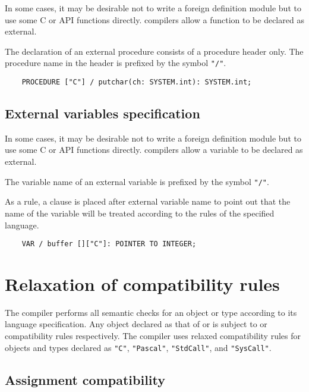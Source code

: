 In some cases, it may be desirable not to write a foreign
definition module but to use some C or API functions directly.
\xds{} compilers allow a function to be declared as external.

The declaration of an external procedure consists of a procedure
header only. The procedure name in the header is prefixed by the
symbol \verb|"/"|.

\verb'    PROCEDURE ["C"] / putchar(ch: SYSTEM.int): SYSTEM.int;'


\subsection{External variables specification}
\label{multilang:extvar}

In some cases, it may be desirable not to write a foreign
definition module but to use some C or API functions directly.
\xds{} compilers allow a variable to be declared as external.

The variable name of an external variable is prefixed by the
symbol \verb|"/"|. 

As a rule, a  
clause is placed after external variable name to point out that the name 
of the variable will be treated according to the rules of the specified 
language.

\verb'    VAR / buffer []["C"]: POINTER TO INTEGER;'




\section{Relaxation of compatibility rules}
\label{multilang:relax}

The compiler performs all semantic checks for an object or type
according to its language specification. Any object declared as that
of \mt{} or \ot{} is subject to \mt{} or \ot{} compatibility rules
respectively.  The compiler uses relaxed compatibility rules for
objects and types declared as \verb'"C"', \verb'"Pascal"',
\verb'"StdCall"', and \verb'"SysCall"'.

\subsection{Assignment compatibility}

